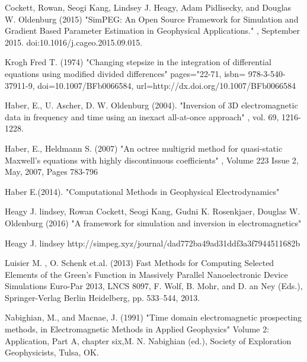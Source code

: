 \documentclass[twoside]{article}
\begin{document}
\begin{thebibliography}{99}


Cockett, Rowan, Seogi Kang, Lindsey J. Heagy, Adam Pidlisecky, and Douglas W. Oldenburg (2015)
\newblock "SimPEG: An Open Source Framework for Simulation and Gradient Based Parameter Estimation in Geophysical Applications." 
, September 2015. doi:10.1016/j.cageo.2015.09.015.

Krogh Fred T. (1974)
\newblock "Changing stepsize in the integration of differential equations using modified divided differences"
\newblock pages="22-71, isbn= 978-3-540-37911-9, doi=10.1007/BFb0066584, url=http://dx.doi.org/10.1007/BFb0066584

Haber, E., U. Ascher, D. W. Oldenburg (2004).
\newblock "Inversion of 3D electromagnetic data in frequency and time using an inexact all-at-once approach"
, vol. 69, 1216-1228.

Haber, E., Heldmann S. (2007)
\newblock "An octree multigrid method for quasi-static Maxwell's equations with highly discontinuous coefficients"
, Volume 223 Issue 2, May, 2007, Pages 783-796

Haber E.(2014).
\newblock "Computational Methods in Geophysical Electrodynamics"

Heagy J. lindsey, Rowan Cockett, Seogi Kang, Gudni K. Rosenkjaer, Douglas W. Oldenburg (2016)
\newblock "A framework for simulation and inversion in electromagnetics"

Heagy J. lindsey
http://simpeg.xyz/journal/dad772ba49ad31ddf3a3f7944511682b

Luisier M. , O. Schenk et.al. (2013)
\newblock Fast Methods for Computing Selected Elements of the Green's Function in Massively Parallel Nanoelectronic Device Simulations
\newblock Euro-Par 2013, LNCS 8097, F. Wolf, B. Mohr, and D. an Ney (Eds.), Springer-Verlag Berlin Heidelberg, pp. 533–544, 2013.

Nabighian, M., and Macnae, J. (1991)
\newblock "Time domain electromagnetic prospecting methods, in Electromagnetic Methods in Applied Geophysics"
\newblock Volume 2: Application, Part A, chapter six,M. N. Nabighian (ed.), Society of Exploration Geophysicists, Tulsa, OK.


\end{thebibliography}
\end{document}
